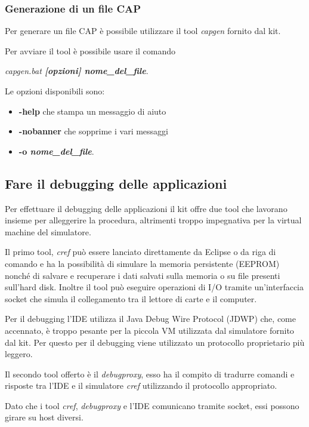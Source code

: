 \subsubsection{Generazione di un file CAP}
Per generare un file CAP è possibile utilizzare il tool \textit{capgen} fornito dal kit.

Per avviare il tool è possibile usare il comando
\begin{center}
    \textit{capgen.bat \textbf{[opzioni] nome\_del\_file}}.
\end{center}

Le opzioni disponibili sono:
\begin{itemize}
    \item \textbf{-help} che stampa un messaggio di aiuto
    \item \textbf{-nobanner} che sopprime i vari messaggi
    \item \textbf{-o \textit{nome\_del\_file}}.
\end{itemize}
 
\subsection{Fare il debugging delle applicazioni}
Per effettuare il debugging delle applicazioni il kit offre due tool che lavorano insieme per alleggerire la procedura, altrimenti troppo impegnativa per la virtual machine del simulatore.

Il primo tool, \textit{cref} può essere lanciato direttamente da Eclipse o da riga di comando e ha la possibilità di simulare la memoria persistente (EEPROM) nonché di salvare e recuperare i dati salvati sulla memoria o su file presenti sull'hard disk. Inoltre il tool può eseguire operazioni di I/O tramite un'interfaccia socket che simula il collegamento tra il lettore di carte e il computer.

Per il debugging l'IDE utilizza il Java Debug Wire Protocol (JDWP) che, come accennato, è troppo pesante per la piccola VM utilizzata dal simulatore fornito dal kit. Per questo per il debugging viene utilizzato un protocollo proprietario più leggero.

Il secondo tool offerto è il \textit{debugproxy}, esso ha il compito di tradurre comandi e risposte tra l'IDE e il simulatore \textit{cref} utilizzando il protocollo appropriato.

Dato che i tool \textit{cref}, \textit{debugproxy} e l'IDE comunicano tramite socket, essi possono girare su host diversi.

